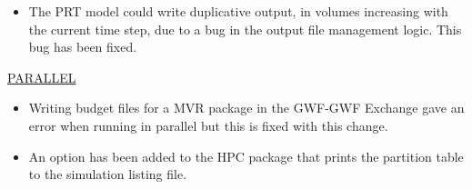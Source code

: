 \begin{itemize}
    \item The PRT model could write duplicative output, in volumes increasing with the current time step, due to a bug in the output file management logic. This bug has been fixed.
\end{itemize}






\underline{PARALLEL}
\begin{itemize}
    \item Writing budget files for a MVR package in the GWF-GWF Exchange gave an error when running in parallel but this is fixed with this change.
    \item An option has been added to the HPC package that prints the partition table to the simulation listing file.
\end{itemize}

